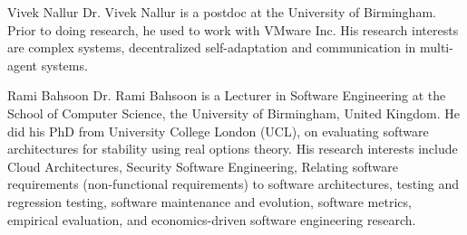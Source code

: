 \documentclass[10pt,journal,compsoc]{IEEEtran}
\begin{document}
    





\begin{IEEEbiographynophoto}{Vivek Nallur}
Dr. Vivek Nallur is a postdoc at the University of Birmingham. Prior to doing research, he used to work with VMware Inc. His research interests are complex systems, decentralized self-adaptation and communication in multi-agent systems.
\end{IEEEbiographynophoto}

\begin{IEEEbiographynophoto}{Rami Bahsoon}
Dr. Rami Bahsoon is a Lecturer in Software Engineering at the School of Computer Science, the University of Birmingham, United Kingdom. He did his PhD from University College London (UCL), on evaluating software architectures for stability using real options theory. His research interests include Cloud Architectures, Security Software Engineering, Relating software requirements (non-functional requirements) to software architectures, testing and regression testing, software maintenance and evolution, software metrics, empirical evaluation, and economics-driven software engineering research.  
\end{IEEEbiographynophoto}
\end{document}
